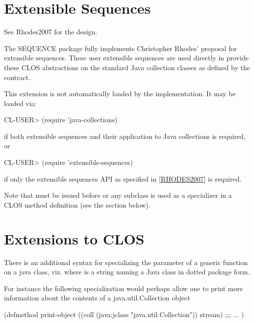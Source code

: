 \documentclass[10pt]{book}
\begin{document}
\section{Extensible Sequences}

See Rhodes2007 \cite{RHODES2007} for the design.

The SEQUENCE package fully implements Christopher Rhodes' proposal for
extensible sequences.  These user extensible sequences are used
directly in  provide these CLOS
abstractions on the standard Java collection classes as defined by the
 contract.

This extension is not automatically loaded by the implementation.   It
may be loaded via:

\begin{listing-lisp}
CL-USER> (require 'java-collections)
\end{listing-lisp}

if both extensible sequences and their application to Java collections
is required, or

\begin{listing-lisp}
CL-USER> (require 'extensible-sequences)
\end{listing-lisp}

if only the extensible sequences API as specified in \ref{RHODES2007} is
required.

Note that  must be issued before
 or any subclass is used as a specializer in a CLOS
method definition (see the section below).

\section{Extensions to CLOS}

There is an additional syntax for specializing the parameter of a
generic function on a java class, viz. 
where  is a string naming a Java class in dotted package
form.

For instance the following specialization would perhaps allow one to
print more information about the contents of a java.util.Collection
object

\begin{listing-lisp}
(defmethod print-object ((coll (java:jclass "java.util.Collection"))
                         stream)
  ;;; ...
)
\end{listing-lisp}
\end{document}
